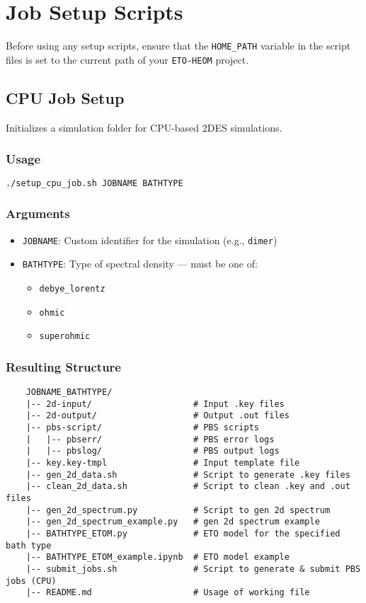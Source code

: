 \documentclass{article}
\begin{document}
\section{Job Setup Scripts}

Before using any setup scripts, ensure that the \texttt{HOME\_PATH} variable in the script files is set to the current path of your \texttt{ETO-HEOM} project.

\subsection{CPU Job Setup}

Initializes a simulation folder for CPU-based 2DES simulations.

\subsubsection*{Usage}
\begin{lstlisting}[language=bash]
./setup_cpu_job.sh JOBNAME BATHTYPE
\end{lstlisting}

\subsubsection*{Arguments}
\begin{itemize}
    \item \texttt{JOBNAME}: Custom identifier for the simulation (e.g., \texttt{dimer})
    \item \texttt{BATHTYPE}: Type of spectral density — must be one of:
    \begin{itemize}
        \item \texttt{debye\_lorentz}
        \item \texttt{ohmic}
        \item \texttt{superohmic}
    \end{itemize}
\end{itemize}

\subsubsection*{Resulting Structure}
\begin{verbatim}
    JOBNAME_BATHTYPE/
    |-- 2d-input/                    # Input .key files
    |-- 2d-output/                   # Output .out files
    |-- pbs-script/                  # PBS scripts
    |   |-- pbserr/                  # PBS error logs
    |   |-- pbslog/                  # PBS output logs
    |-- key.key-tmpl                 # Input template file
    |-- gen_2d_data.sh               # Script to generate .key files
    |-- clean_2d_data.sh             # Script to clean .key and .out files
    |-- gen_2d_spectrum.py           # Script to gen 2d spectrum
    |-- gen_2d_spectrum_example.py   # gen 2d spectrum example
    |-- BATHTYPE_ETOM.py             # ETO model for the specified bath type
    |-- BATHTYPE_ETOM_example.ipynb  # ETO model example
    |-- submit_jobs.sh               # Script to generate & submit PBS jobs (CPU)
    |-- README.md                    # Usage of working file
\end{verbatim}
\end{document}
